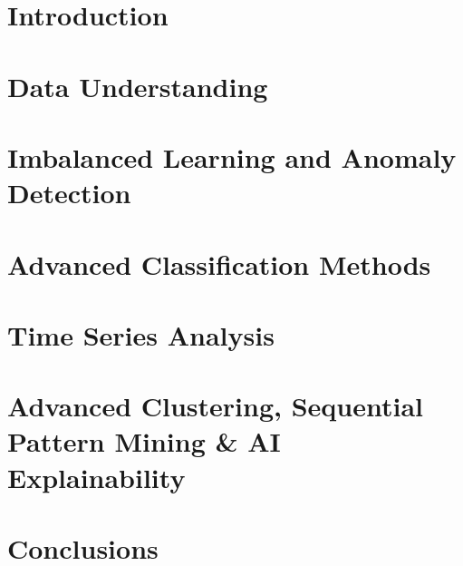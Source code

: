 





    
    
    \tableofcontents
    \thispagestyle{empty}
    
    \newpage
    \justifying
    
    \setcounter{page}{1}
    \chapter*{Introduction}
    
  
    \chapter{Data Understanding}
    
    
    \chapter{Imbalanced Learning and Anomaly Detection}
    
    
    \chapter{Advanced Classification Methods}
    
    
    \chapter{Time Series Analysis}
    
    
    \chapter{Advanced Clustering, Sequential Pattern Mining \& AI Explainability }
    
    
    \chapter*{Conclusions}
    
    



